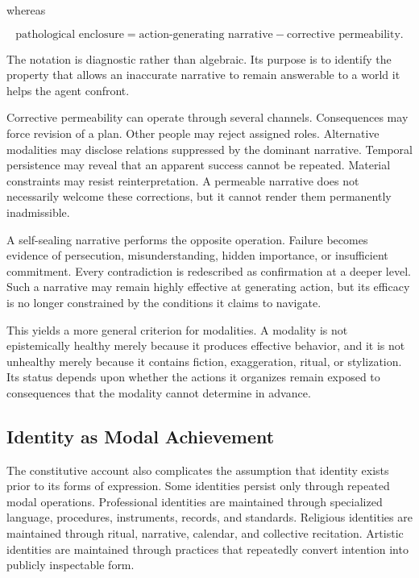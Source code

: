 \documentclass[11pt]{article}
\begin{document}
whereas

\begin{equation}
  \text{pathological enclosure}
  =
  \text{action-generating narrative}
  -
  \text{corrective permeability}.
  \label{eq:pathological-enclosure}
\end{equation}

The notation is diagnostic rather than algebraic. Its purpose is to identify
the property that allows an inaccurate narrative to remain answerable to a
world it helps the agent confront.

Corrective permeability can operate through several channels. Consequences
may force revision of a plan. Other people may reject assigned roles.
Alternative modalities may disclose relations suppressed by the dominant
narrative. Temporal persistence may reveal that an apparent success cannot be
repeated. Material constraints may resist reinterpretation. A permeable
narrative does not necessarily welcome these corrections, but it cannot render
them permanently inadmissible.

A self-sealing narrative performs the opposite operation. Failure becomes
evidence of persecution, misunderstanding, hidden importance, or insufficient
commitment. Every contradiction is redescribed as confirmation at a deeper
level. Such a narrative may remain highly effective at generating action, but
its efficacy is no longer constrained by the conditions it claims to
navigate.

This yields a more general criterion for modalities. A modality is not
epistemically healthy merely because it produces effective behavior, and it
is not unhealthy merely because it contains fiction, exaggeration, ritual, or
stylization. Its status depends upon whether the actions it organizes remain
exposed to consequences that the modality cannot determine in advance.

\subsection{Identity as Modal Achievement}

The constitutive account also complicates the assumption that identity exists
prior to its forms of expression. Some identities persist only through
repeated modal operations. Professional identities are maintained through
specialized language, procedures, instruments, records, and standards.
Religious identities are maintained through ritual, narrative, calendar, and
collective recitation. Artistic identities are maintained through practices
that repeatedly convert intention into publicly inspectable form.
\end{document}
